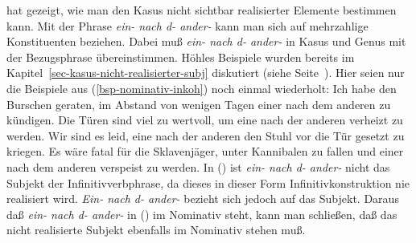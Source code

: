 \citet*[Kapitel~6]{Hoehle83a} 
hat gezeigt, wie man den Kasus nicht sichtbar realisierter Elemente bestimmen kann. Mit der Phrase
{\em ein- nach d- ander-\/} kann 
man sich auf mehrzahlige Konstituenten beziehen. Dabei muß {\em ein- nach d- ander-\/}
in Kasus und Genus mit der Bezugsphrase übereinstimmen. Höhles Beispiele wurden
bereits im Kapitel~\ref{sec-kasus-nicht-realisierter-subj} diskutiert (siehe Seite~\pageref{bsp-tueren-hoehle}).
Hier seien nur die Beispiele aus (\ref{bsp-nominativ-inkoh}) noch einmal wiederholt:
\eal
\label{bsp-nominativ-inkoh-zwei}
\ex Ich habe den Burschen geraten, im Abstand von wenigen Tagen einer nach dem anderen
      zu kündigen.\label{bsp-nominativ-inkoh-geraten-zwei}
\ex Die Türen sind viel zu wertvoll, um eine nach der anderen verheizt zu werden.
\ex Wir sind es leid, eine nach der anderen den Stuhl vor die Tür gesetzt zu kriegen.
\ex Es wäre fatal für die Sklavenjäger, unter Kannibalen zu fallen und einer nach dem
      anderen verspeist zu werden.
\zl
In () ist {\em ein- nach d- ander-\/} nicht das Subjekt der Infinitivverbphrase,
da dieses in dieser Form Infinitivkonstruktion nie realisiert wird. {\em Ein- nach d- ander-\/} bezieht sich
jedoch auf das Subjekt. Daraus daß {\em ein- nach d- ander-\/} in () im Nominativ
steht, kann man schließen, daß das nicht realisierte Subjekt ebenfalls im Nominativ
stehen muß.



